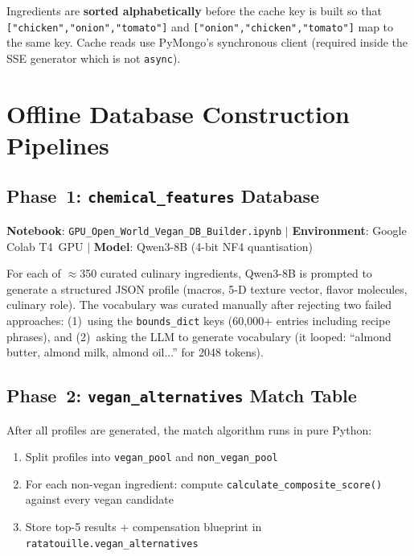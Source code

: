 \documentclass[12pt, a4paper]{article}
\begin{document}
Ingredients are \textbf{sorted alphabetically} before the cache key is built so that
\texttt{["chicken","onion","tomato"]} and \texttt{["onion","chicken","tomato"]} map to the
same key.  Cache reads use PyMongo's synchronous client (required inside the SSE generator
which is not \texttt{async}).

\section{Offline Database Construction Pipelines}

\subsection{Phase~1: \texttt{chemical\_features} Database}

\textbf{Notebook}: \texttt{GPU\_Open\_World\_Vegan\_DB\_Builder.ipynb} $|$
\textbf{Environment}: Google Colab T4~GPU $|$
\textbf{Model}: Qwen3-8B (4-bit NF4 quantisation)

For each of $\approx$350 curated culinary ingredients, Qwen3-8B is prompted to generate
a structured JSON profile (macros, 5-D texture vector, flavor molecules, culinary role).
The vocabulary was curated manually after rejecting two failed approaches: (1)~using the
\texttt{bounds\_dict} keys (60,000+ entries including recipe phrases), and (2)~asking the
LLM to generate vocabulary (it looped: ``almond butter, almond milk, almond oil...'' for
2048 tokens).

\subsection{Phase~2: \texttt{vegan\_alternatives} Match Table}

After all profiles are generated, the match algorithm runs in pure Python:
\begin{enumerate}
  \item Split profiles into \texttt{vegan\_pool} and \texttt{non\_vegan\_pool}
  \item For each non-vegan ingredient: compute \texttt{calculate\_composite\_score()} against every vegan candidate
  \item Store top-5 results + compensation blueprint in \texttt{ratatouille.vegan\_alternatives}
\end{enumerate}
\end{document}

